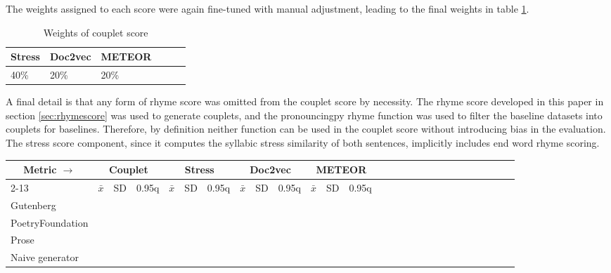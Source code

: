 \documentclass[11pt,a4paper]{article}
\begin{document}
The weights assigned to each score were again fine-tuned with manual adjustment, leading to the final weights in table \ref{table:weight_couplet_score}.

\begin{table}[ht]
\centering
\begin{tabular}{lll c c c}
	\hline\hline
	Stress & Doc2vec & METEOR \\ [0.5ex]
	\hline\hline
	40\% & 20\% & 20\% \\ [0.5ex]
	\hline
\end{tabular}
\caption{Weights of couplet score}
\label{table:weight_couplet_score}
\end{table}

A final detail is that any form of rhyme score was omitted from the couplet score by necessity. The rhyme score developed in this paper in section \ref{sec:rhymescore} was used to generate couplets, and the pronouncingpy rhyme function was used to filter the baseline datasets into couplets for baselines. Therefore, by definition neither function can be used in the couplet score without introducing bias in the evaluation. The stress score component, since it computes the syllabic stress similarity of both sentences, implicitly includes end word rhyme scoring.



\begin{table*}[ht]
\begin{tabular}{|l|l|l|l|l|l|l|l|l|l|l|l|l|l|c|c|c|c|c|c|c|c|c|c|c|c|c|}
\hline\hline
\multicolumn{1}{|c|}{Metric $\rightarrow$} & \multicolumn{3}{c|}{Couplet} & \multicolumn{3}{c|}{Stress} & \multicolumn{3}{c|}{Doc2vec} & \multicolumn{3}{c|}{METEOR}\\
\cline{2-13}
\multicolumn{1}{|c|}{$\downarrow$ Dataset} & $\bar{x}$ & SD & 0.95q & $\bar{x}$ & SD & 0.95q & $\bar{x}$ & SD & 0.95q & $\bar{x}$ & SD & 0.95q \\
\hline\hline
Gutenberg \\
PoetryFoundation \\
Prose \\
Naive generator \\
\hline
\end{tabular}

\caption{Couplet scoring results on 1,000 samples}
\label{table:couplet_results}
\end{table*}
\end{document}
